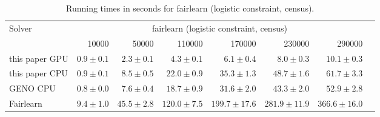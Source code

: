 
\begin{table}[h!]
\begin{center}
  \small
  \begin{tabular}{l*{7}{r}}
    \toprule
    \multirow{2}{*}{Solver} & \multicolumn{6}{c}{fairlearn (logistic constraint, census)} \\
    \cmidrule{2-7}
                   & 10000        & 50000         & 110000         & 170000          & 230000          & 290000 \\
    \midrule                                                                                           
    this paper GPU & $0.9\pm 0.1$ & $2.3\pm 0.1$  & $4.3\pm 0.1$   & $6.1\pm 0.4$    & $8.0\pm 0.3$    & $10.1\pm 0.3$ \\
    this paper CPU & $0.9\pm 0.1$ & $8.5\pm 0.5$  & $22.0\pm 0.9$  & $35.3\pm 1.3$   & $48.7\pm 1.6$   & $61.7\pm 3.3$ \\
    GENO CPU       & $0.8\pm 0.0$ & $7.6\pm 0.4$  & $18.7\pm 0.9$  & $31.6\pm 2.0$   & $43.3\pm 2.0$   & $52.9\pm 2.8$ \\
    Fairlearn      & $9.4\pm 1.0$ & $45.5\pm 2.8$ & $120.0\pm 7.5$ & $199.7\pm 17.6$ & $281.9\pm 11.9$ & $366.6\pm 16.0$ \\
    \bottomrule
  \end{tabular}%
  \caption{Running times in seconds for fairlearn (logistic constraint, census).}
  \end{center}
\end{table}
